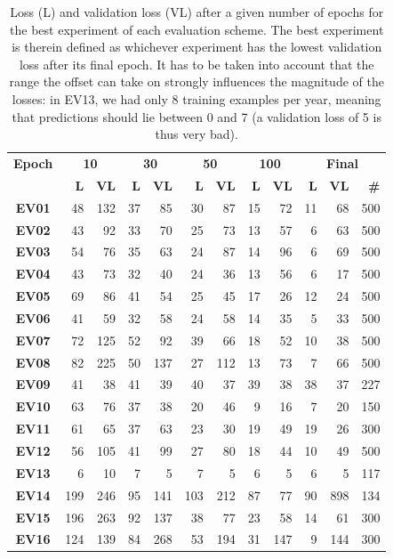 \begin{table}[h]
  \centering
  \begin{tabular}{crrrrrrrrrrr}
    \toprule
    \textbf{Epoch} & \multicolumn{2}{c}{\textbf{10}} & \multicolumn{2}{c}{\textbf{30}} & \multicolumn{2}{c}{\textbf{50}} & \multicolumn{2}{c}{\textbf{100}} & \multicolumn{3}{c}{\textbf{Final}} \\
    & \textbf{L} & \textbf{VL} & \textbf{L} & \textbf{VL} & \textbf{L} & \textbf{VL} & \textbf{L} & \textbf{VL} & \textbf{L} & \textbf{VL} & \textbf{\#} \\
    \midrule
    \textbf{EV01} & 48 & 132 & 37 & 85 & 30 & 87 & 15 & 72 & 11 & 68 & 500 \\
    \textbf{EV02} & 43 & 92 & 33 & 70 & 25 & 73 & 13 & 57 & 6 & 63 & 500 \\
    \textbf{EV03} & 54 & 76 & 35 & 63 & 24 & 87 & 14 & 96 & 6 & 69 & 500 \\
    \textbf{EV04} & 43 & 73 & 32 & 40 & 24 & 36 & 13 & 56 & 6 & 17 & 500 \\
    \textbf{EV05} & 69 & 86 & 41 & 54 & 25 & 45 & 17 & 26 & 12 & 24 & 500 \\
    \textbf{EV06} & 41 & 59 & 32 & 58 & 24 & 58 & 14 & 35 & 5 & 33 & 500 \\
    \textbf{EV07} & 72 & 125    &    52 & 92    &    39 & 66 &    18 & 52 & 10 & 38 & 500 \\
    \textbf{EV08} & 82 & 225    &    50 & 137 & 27 & 112    &    13 & 73 & 7 & 66 & 500 \\
    \textbf{EV09} & 41 & 38 & 41 & 39 & 40 & 37 & 39 & 38 & 38 & 37 & 227 \\
    \textbf{EV10} & 63 & 76 & 37 & 38 & 20 & 46 & 9 & 16 & 7 & 20 & 150 \\
    \textbf{EV11} & 61 & 65 & 37 & 63 & 23 & 30 & 19 & 49 & 19 & 26 & 300 \\
    \textbf{EV12} & 56 & 105    &    41 & 99    &    27 & 80    &    18 & 44 & 10 & 49 & 500 \\
    \textbf{EV13} & 6 & 10    &    7 & 5    &    7 & 5    &    6 & 5 & 6 & 5 & 117 \\
    \textbf{EV14} & 199 & 246 & 95 & 141 & 103 & 212 & 87 & 77 & 90 & 898 & 134 \\
    \textbf{EV15} & 196 & 263 & 92 & 137    &    38 & 77    &    23 & 58 & 14 & 61 & 300 \\
    \textbf{EV16} & 124 & 139 & 84 & 268    &    53 & 194 & 31 & 147 & 9 & 144 & 300 \\
    \bottomrule
  \end{tabular}
  \caption{Loss (L) and validation loss (VL) after a given number of epochs for the best experiment of each evaluation scheme. The best experiment is therein defined as whichever experiment has the lowest validation loss after its final epoch. It has to be taken into account that the range the offset can take on strongly influences the magnitude of the losses: in EV13, we had only 8 training examples per year, meaning that predictions should lie between 0 and 7 (a validation loss of 5 is thus very bad).}
  \label{tab:evaluation_scheme_results}
\end{table}

